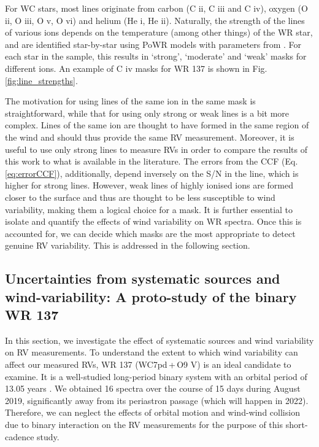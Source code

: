 For WC stars, most lines originate from carbon (C {\sc ii}, C {\sc iii} and C {\sc iv}), oxygen (O {\sc ii}, O {\sc iii}, O {\sc v}, O {\sc vi}) and helium (He {\sc i}, He {\sc ii}). Naturally, the strength of the lines of various ions depends on the temperature (among other things) of the WR star, and are identified star-by-star using PoWR models with parameters from \citealt{sander_galactic_2012}. For each star in the sample, this results in `strong', `moderate' and `weak' masks for different ions. An example of C {\sc iv} masks for WR 137 is shown in Fig. \ref{fig:line_strengths}.

The motivation for using lines of the same ion in the same mask is straightforward, while that for using only strong or weak lines is a bit more complex. Lines of the same ion are thought to have formed in the same region of the wind and should thus provide the same RV measurement. Moreover, it is useful to use only strong lines to measure RVs in order to compare the results of this work to what is available in the literature. The errors from the CCF (Eq. \ref{eq:errorCCF}), additionally, depend inversely on the S/N in the line, which is higher for strong lines. However, weak lines of highly ionised ions are formed closer to the surface and thus are thought to be less susceptible to wind variability, making them a logical choice for a mask. It is further essential to isolate and quantify the effects of wind variability on WR spectra. Once this is accounted for, we can decide which masks are the most appropriate to detect genuine RV variability. This is addressed in the following section.

\subsection{Uncertainties from systematic sources and wind-variability: A proto-study of the binary WR 137} \label{sect:wind-var}
In this section, we investigate the effect of systematic sources and wind variability on RV measurements. To understand the extent to which wind variability can affect our measured RVs, WR 137 (WC7pd\,+\,O9 V) is an ideal candidate to examine. It is a well-studied long-period binary system with an orbital period of 13.05 years \citep{lefevre_spectroscopic_2005,richardson_chara_2016}. We obtained 16 spectra over the course of 15 days during August 2019, significantly away from its periastron passage (which will happen in 2022). Therefore, we can neglect the effects of orbital motion and wind-wind collision \citep[e.g.][]{luhrs_high-resolution_2002} due to binary interaction on the RV measurements for the purpose of this short-cadence study.

